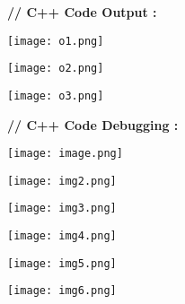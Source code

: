 \documentclass[11pt, a4paper]{article}
\begin{document}
\newpage
\textbf{// C++ Code Output :}
\vspace{0.8cm}
\begin{center}
    \texttt{[image: o1.png]}
\end{center}
\vspace{0.8cm}
\begin{center}
    \texttt{[image: o2.png]}
\end{center}

\newpage
\vspace{0.5cm}
\begin{center}
    \texttt{[image: o3.png]}
\end{center}

\newpage
\textbf{// C++ Code Debugging :}
\vspace{0.8cm}

\begin{center}
    \texttt{[image: image.png]}
\end{center}

\newpage
\vspace{0.8cm}

\begin{center}
    \texttt{[image: img2.png]}
\end{center}
\newpage
\vspace{0.8cm}

\begin{center}
    \texttt{[image: img3.png]}
\end{center}
\newpage
\vspace{0.8cm}

\begin{center}
    \texttt{[image: img4.png]}
\end{center}
\newpage
\vspace{0.8cm}

\begin{center}
    \texttt{[image: img5.png]}
\end{center}
\newpage
\vspace{0.8cm}

\begin{center}
    \texttt{[image: img6.png]}
\end{center}
\end{document}
